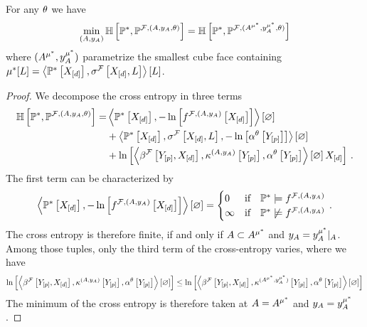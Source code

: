 \begin{lemma}
    \label{lem:minCrossEntropyHardparam}
    For any $\theta$ we have
    \begin{align*}
        \min_{(A,y_{A})} \mathbb{H}\left[\mathbb{P}^*,\mathbb{P}^{\mathcal{F},(A,y_{A},\theta)}\right]
        = \mathbb{H}\left[\mathbb{P}^*,\mathbb{P}^{\mathcal{F},(A^{\mu^*},y_{A}^{\mu^*},\theta)}\right]
    \end{align*}
    where $(A^{\mu^*},y_{A}^{\mu^*})$ parametrize the smallest cube face containing $\mu^*[L]=\left\langle \mathbb{P}^*\left[X_{[d]}\right],\sigma^{\mathcal{F}}\left[X_{[d]},L\right]\right\rangle \left[ L \right]$.
\end{lemma}
\begin{proof}
    We decompose the cross entropy in three terms
    \begin{align*}
        \mathbb{H}\left[\mathbb{P}^*,\mathbb{P}^{\mathcal{F},(A,y_{A},\theta)}\right]
        =& \left\langle \mathbb{P}^*\left[X_{[d]}\right],-\ln \left[ f^{\mathcal{F},(A,y_{A})}\left[X_{[d]}\right] \right]\right\rangle \left[ \varnothing \right] \\
        &+ \left\langle \mathbb{P}^*\left[X_{[d]}\right],\sigma^{\mathcal{F}}\left[X_{[d]},L\right],-\ln \left[ \alpha^\theta\left[Y_{[p]}\right] \right]\right\rangle \left[ \varnothing \right] \\
        &+ \ln \left[ \left\langle \beta^{\mathcal{F}}\left[Y_{[p]},X_{[d]}\right],\kappa^{(A,y_{A})}\left[Y_{[p]}\right],\alpha^\theta\left[Y_{[p]}\right]\right\rangle \left[ \varnothing \right]{X_{[d]}} \right] \, .
    \end{align*}
    The first term can be characterized by
    \begin{align*}
        \left\langle \mathbb{P}^*\left[X_{[d]}\right],-\ln \left[ f^{\mathcal{F},(A,y_{A})}\left[X_{[d]}\right] \right]\right\rangle \left[ \varnothing \right]
        =\begin{cases}
             0 & \text{if}\quad \mathbb{P}^*\models f^{\mathcal{F},(A,y_{A})} \\
             \infty & \text{if}\quad \mathbb{P}^*\not\models f^{\mathcal{F},(A,y_{A})}
        \end{cases} \, .
    \end{align*}
    The cross entropy is therefore finite, if and only if $A\subset A^{\mu^*}$ and $y_{A}={y_{A}^{\mu^*}}|_{A}$.
    Among those tuples, only the third term of the cross-entropy varies, where we have
    \begin{align*}
        \ln \left[ \left\langle \beta^{\mathcal{F}}\left[Y_{[p]},X_{[d]}\right],\kappa^{(A,y_{A})}\left[Y_{[p]}\right],\alpha^\theta\left[Y_{[p]}\right]\right\rangle \left[ \varnothing \right] \right]
        \leq \ln \left[ \left\langle \beta^{\mathcal{F}}\left[Y_{[p]},X_{[d]}\right],\kappa^{(A^{\mu^*},y_{A}^{\mu^*})}\left[Y_{[p]}\right],\alpha^\theta\left[Y_{[p]}\right]\right\rangle \left[ \varnothing \right] \right]
    \end{align*}
    The minimum of the cross entropy is therefore taken at $A=A^{\mu^*}$ and $y_{A}=y_{A}^{\mu^*}$.
\end{proof}

